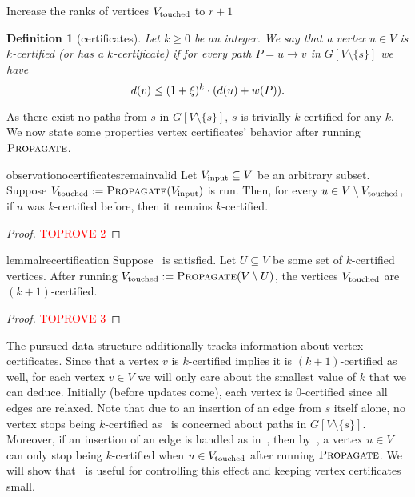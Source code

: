 \documentclass[11pt,letterpaper]{article}
\theoremstyle{plain}
\newtheorem{definition}[theorem]{Definition}
\newcommand{\wei}{w}
\newcommand{\set}[1]{\left\lbrace #1 \right\rbrace}
\DeclareMathOperator*{\PD}{\textsc{Propagate}}
\begin{document}
\begin{algorithm}[t]
\caption{($e=sv$)}\label{alg:insert}
\begin{algorithmic}[1]
  \State{$E := E \cup \set{e}$}
  \If{$d(v) > (1 + \epsp)\wei(e)$}
    \State{$d(v) := \wei(e)$}
    \State{$\Vtouch := \PD(\set{v})$} \label{line:propagation}
    \State Increase the ranks of vertices $V_{\mathrm{touched}}$ to $r+1$\label{line:recertify}
    \label{line:synchronize}
  \EndIf
\end{algorithmic}
\end{algorithm} 
\begin{definition}[certificates]\label{def:cert}
Let $k\geq 0$ be an integer.
We say that a vertex $u \in V$ is $k$-certified (or has a $k$-certificate) if for every path $P = u \to v$ in $G[V\setminus \{s\}]$ we have
\[d(v)\leq (1+\epsp)^k\cdot (d(u)+\wei(P)).\] 
\end{definition}
As there exist no paths from $s$ in $G[V\setminus\{s\}]$, $s$ is trivially $k$-certified for any $k$. We now state
some properties vertex certificates' behavior after running $\PD$.
\begin{restatable}{observation}{ocertificatesremainvalid}\label{certificates_remain_valid}
Let $V_{\mathrm{input}}\subseteq V$ be an arbitrary subset. Suppose $\Vtouch:=\PD(\Vinput)$ is run.
Then, for every $u\in V \setminus V_{\mathrm{touched}}$, if $u$ was $k$-certified before, then it remains $k$-certified.
\end{restatable}
\begin{proof}\textcolor{red}{TOPROVE 2}\end{proof}
\begin{restatable}{lemma}{lrecertification}\label{recertification_theorem}
Suppose~ is satisfied.
Let $U \subseteq V$ be some set of $k$-certified vertices.
After running ${\Vtouch:=\PD(V \setminus U)}$, the vertices $V_{\mathrm{touched}}$ are $(k + 1)$-certified.
\end{restatable}
\begin{proof}\textcolor{red}{TOPROVE 3}\end{proof}


The pursued data structure additionally tracks information about vertex certificates.
Since that a vertex $v$ is $k$-certified implies it is $(k + 1)$-certified as well,
for each vertex $v \in V$ we will only care about the smallest value of $k$ that we can deduce.
Initially (before updates come), each vertex is $0$-certified since all edges are relaxed.
Note that due to an insertion of an edge from $s$ itself alone, no vertex stops being $k$-certified as~ is concerned about paths in $G[V\setminus\{s\}]$.
Moreover, if an insertion of an edge is handled as in~, then by~,
a vertex $u \in V$ can only stop being $k$-certified when $u \in V_{\mathrm{touched}}$ after running $\PD$.
We will show that~ is useful for controlling this effect and keeping vertex certificates small.
\end{document}
